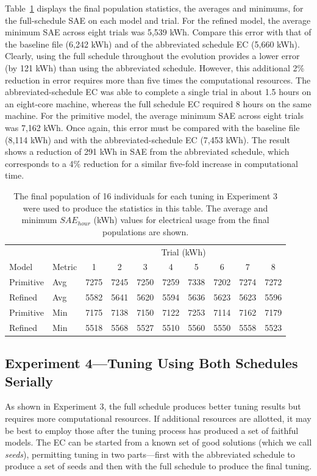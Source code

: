 \documentclass[preprint, review, 12pt]{elsarticle}
\begin{document}
Table~\ref{tab:hourly-full} displays the final population statistics, the averages and minimums, for the full-schedule SAE on each model and trial. For the refined model, the average minimum SAE across eight trials was 5,539 kWh. Compare this error with that of the baseline file (6,242 kWh) and of the abbreviated schedule EC (5,660 kWh). Clearly, using the full schedule throughout the evolution provides a lower error (by 121 kWh) than using the abbreviated schedule. However, this additional 2\% reduction in error requires more than five times the computational resources. The abbreviated-schedule EC was able to complete a single trial in about 1.5 hours on an eight-core machine, whereas the full schedule EC required 8 hours on the same machine. For the primitive model, the average minimum SAE across eight trials was 7,162 kWh. Once again, this error must be compared with the baseline file (8,114 kWh) and with the abbreviated-schedule EC (7,453 kWh). The result shows a reduction of 291 kWh in SAE from the abbreviated schedule, which corresponds to a 4\% reduction for a similar five-fold increase in computational time.

\begin{table}[htbp]
\centering
\caption{The final population of 16 individuals for each tuning in Experiment 3 were used to produce the statistics in this table. The average and minimum $SAE_{hour}$ (kWh) values for electrical usage from the final populations are shown.}
\label{tab:hourly-full}
\begin{tabular}{llcccccccc}
\toprule
 &  & \multicolumn{8}{c}{Trial (kWh)}\\
Model & Metric & 1 & 2 & 3 & 4 & 5 & 6 & 7 & 8\\
\midrule
Primitive & Avg & 7275 & 7245 & 7250 & 7259 & 7338 & 7202 & 7274 & 7272\\\rowcolor{DarkRow}
Refined   & Avg & 5582 & 5641 & 5620 & 5594 & 5636 & 5623 & 5623 & 5596\\
Primitive & Min & 7175 & 7138 & 7150 & 7122 & 7253 & 7114 & 7162 & 7179\\\rowcolor{DarkRow}
Refined   & Min & 5518 & 5568 & 5527 & 5510 & 5560 & 5550 & 5558 & 5523\\
\bottomrule
\end{tabular}
\end{table}



\subsection{Experiment 4---Tuning Using Both Schedules Serially}
\label{sub:experiment4}
As shown in Experiment 3, the full schedule produces better tuning results but requires more computational resources. If additional resources are allotted, it may be best to employ those after the tuning process has produced a set of faithful models. The EC can be started from a known set of good solutions (which we call \emph{seeds}), permitting tuning in two parts---first with the abbreviated schedule to produce a set of seeds and then with the full schedule to produce the final tuning.
\end{document}
